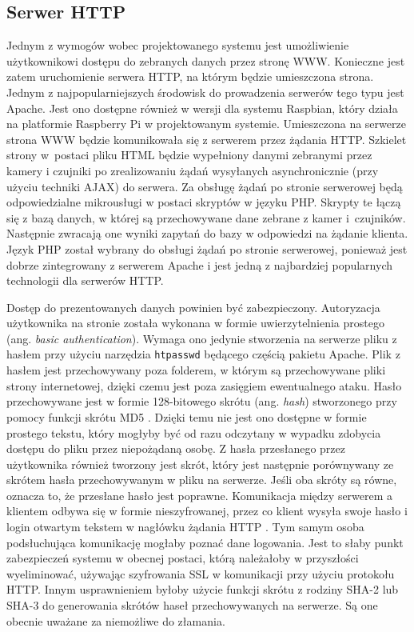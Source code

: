 \documentclass[a4paper,11pt,twoside]{article}
\begin{document}
\subsection{Serwer HTTP}
Jednym z wymogów wobec projektowanego systemu jest umożliwienie użytkownikowi dostępu do zebranych danych przez stronę WWW. Konieczne jest zatem uruchomienie serwera HTTP, na którym będzie umieszczona strona. Jednym z najpopularniejszych środowisk do prowadzenia serwerów tego typu jest Apache. Jest ono dostępne również w wersji dla systemu Raspbian, który działa na platformie Raspberry Pi w projektowanym systemie. Umieszczona na serwerze strona WWW będzie komunikowała się z serwerem przez żądania HTTP. Szkielet strony w~postaci pliku HTML będzie wypełniony danymi zebranymi przez kamery i czujniki po zrealizowaniu żądań wysyłanych asynchronicznie (przy użyciu techniki AJAX) do serwera. Za obsługę żądań po stronie serwerowej będą odpowiedzialne mikrousługi w postaci skryptów w języku PHP. Skrypty te łączą się z bazą danych, w której są przechowywane dane zebrane z kamer i~czujników. Następnie zwracają one wyniki zapytań do bazy w odpowiedzi na żądanie klienta. Język PHP został wybrany do obsługi żądań po stronie serwerowej, ponieważ jest dobrze zintegrowany z serwerem Apache i jest jedną z najbardziej popularnych technologii dla serwerów HTTP.

Dostęp do prezentowanych danych powinien być zabezpieczony. Autoryzacja użytkownika na stronie została wykonana w formie uwierzytelnienia prostego (ang. \textit{basic authentication}). Wymaga ono jedynie stworzenia na serwerze pliku z hasłem przy użyciu narzędzia \texttt{htpasswd} będącego częścią pakietu Apache. Plik z hasłem jest przechowywany poza folderem, w którym są przechowywane pliki strony internetowej, dzięki czemu jest poza zasięgiem ewentualnego ataku. Hasło przechowywane jest w formie 128-bitowego skrótu (ang. \textit{hash}) stworzonego przy pomocy funkcji skrótu MD5 \cite{apache-password}. Dzięki temu nie jest ono dostępne  w formie prostego tekstu, który mogłyby być od razu odczytany w wypadku zdobycia dostępu do pliku przez niepożądaną osobę. Z hasła przesłanego przez użytkownika również tworzony jest skrót, który jest następnie porównywany ze skrótem hasła przechowywanym w pliku na serwerze. Jeśli oba skróty są równe, oznacza to, że przesłane hasło jest poprawne. Komunikacja między serwerem a klientem odbywa się w formie nieszyfrowanej, przez co klient wysyła swoje hasło i login otwartym tekstem w nagłówku żądania HTTP \cite{http-auth}. Tym samym osoba podsłuchująca komunikację mogłaby poznać dane logowania. Jest to słaby punkt zabezpieczeń systemu w obecnej postaci, którą należałoby w przyszłości wyeliminować, używając szyfrowania SSL w komunikacji przy użyciu protokołu HTTP. Innym usprawnieniem byłoby użycie funkcji skrótu z rodziny SHA-2 lub SHA-3 do generowania skrótów haseł przechowywanych na serwerze. Są one obecnie uważane za niemożliwe do złamania.
 
\end{document}
